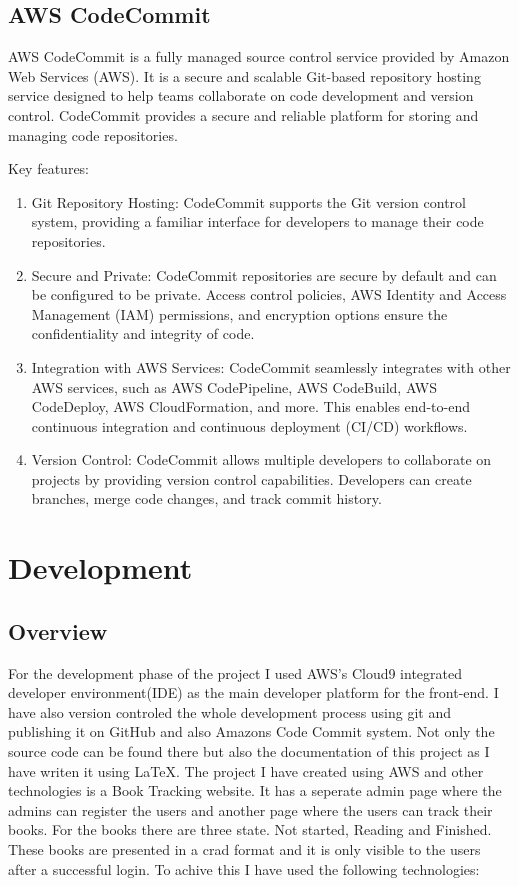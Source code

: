 \documentclass[11pt,a4paper,oneside]{report}
\begin{document}
\section{AWS CodeCommit}
AWS CodeCommit is a fully managed source control service provided by Amazon Web Services (AWS). It is a secure and scalable Git-based repository hosting service designed to help teams collaborate on code development and version control. CodeCommit provides a secure and reliable platform for storing and managing code repositories.

Key features:
\begin{enumerate}
  \item Git Repository Hosting: CodeCommit supports the Git version control system, providing a familiar interface for developers to manage their code repositories.
  \item Secure and Private: CodeCommit repositories are secure by default and can be configured to be private. Access control policies, AWS Identity and Access Management (IAM) permissions, and encryption options ensure the confidentiality and integrity of code.
  \item Integration with AWS Services: CodeCommit seamlessly integrates with other AWS services, such as AWS CodePipeline, AWS CodeBuild, AWS CodeDeploy, AWS CloudFormation, and more. This enables end-to-end continuous integration and continuous deployment (CI/CD) workflows.
  \item Version Control: CodeCommit allows multiple developers to collaborate on projects by providing version control capabilities. Developers can create branches, merge code changes, and track commit history. \cite{awscodecommit}
\end{enumerate}



\chapter{Development}

\section{Overview}
For the development phase of the project I used AWS's Cloud9 integrated developer environment(IDE) as the main developer platform for the front-end.
I have also version controled the whole development process using git and publishing it on GitHub and also Amazons Code Commit system. Not only the source code can be found there but also the documentation of this project as I have writen it using \LaTeX{}.
The project I have created using AWS and other technologies is a Book Tracking website. It has a seperate admin page where the admins can register the users and another page where the users can track their books.
For the books there are three state. Not started, Reading and Finished. These books are presented in a crad format and it is only visible to the users after a successful login.
To achive this I have used the following technologies:
\end{document}
